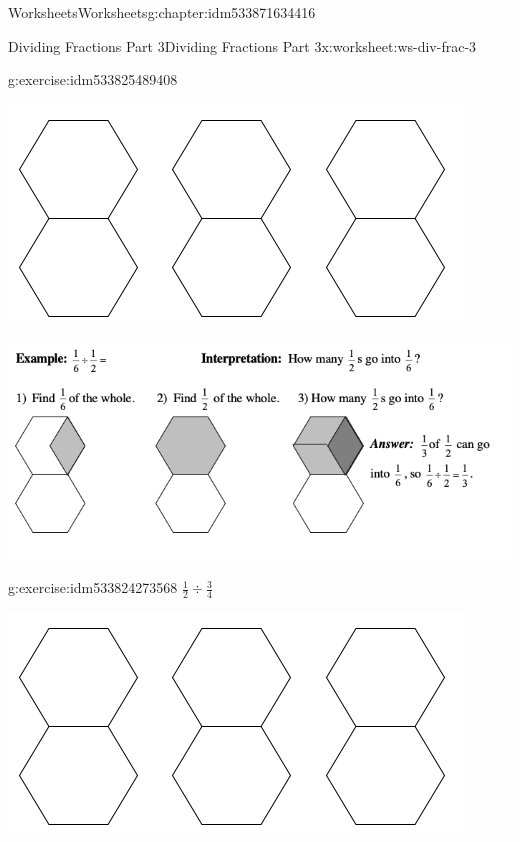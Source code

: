 \documentclass[twoside,11pt,]{book}
\begin{document}
\begin{chapterptx}{Worksheets}{}{Worksheets}{}{}{g:chapter:idm533871634416}
\begin{worksheet-section-numberless}{Dividing Fractions Part 3}{}{Dividing Fractions Part 3}{}{}{x:worksheet:ws-div-frac-3}
\begin{divisionexercise}{1}{}{}{g:exercise:idm533825489408}
\begin{sidebyside}{1}{0.15}{0.15}{0}
\begin{sbspanel}{0.7}
\includegraphics[width=1\linewidth]{images/3-double-hexagons.png}
\end{sbspanel}%
\end{sidebyside}%
\end{divisionexercise}%
\clearpage
\begin{introduction}{}%
\begin{sidebyside}{1}{0}{0}{0}%
\begin{sbspanel}{1}%
\includegraphics[width=1\linewidth]{images/frac-div-hex-2.png}
\end{sbspanel}%
\end{sidebyside}%
\end{introduction}%
\begin{divisionexercise}{2}{}{}{g:exercise:idm533824273568}%
\(\frac{1}{2} \div \frac{3}{4} \)%
\begin{sidebyside}{1}{0.15}{0.15}{0}%
\begin{sbspanel}{0.7}%
\includegraphics[width=1\linewidth]{images/3-double-hexagons.png}

\end{sbspanel}
\end{sidebyside}
\end{divisionexercise}
\end{worksheet-section-numberless}
\end{chapterptx}
\end{document}
